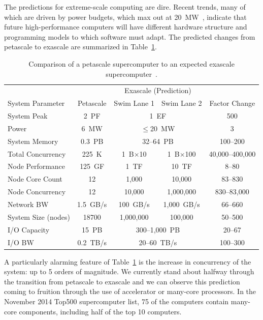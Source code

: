 \documentclass{superfri}
\newcommand*{\lcite}[1]{~\cite{#1}}
\begin{document}
The predictions for extreme-scale computing are dire.  Recent trends, many
of which are driven by power budgets, which max out at
20~MW\lcite{ExascaleArchitecturesReport}, indicate that future
high-performance computers will have different hardware structure and
programming models to which software must adapt. The predicted changes from
petascale to exascale are summarized in
Table~\ref{table:PetascaleVsExascale}.

\begin{table}[htdp]
  \centering
  \caption{Comparison of a petascale supercomputer to an expected exascale
    supercomputer\lcite{ScientificDiscoveryExascale2011}.}
  \label{table:PetascaleVsExascale}
  \begin{tabular}{@{}lcccc@{}}
    \toprule
    & & \multicolumn{2}{c}{Exascale (Prediction)} & \\
    System Parameter & Petascale & Swim Lane 1 & Swim Lane 2 & Factor Change \\
    \midrule
    System Peak & 2~PF & \multicolumn{2}{c}{1~EF} & 500 \\
    Power & 6~MW & \multicolumn{2}{c}{$\le$20~MW} & 3\\
    System Memory & 0.3~PB & \multicolumn{2}{c}{32--64~PB} & 100--200 \\ %
    Total Concurrency & 225~K & 1~B$\times$10 & 1~B$\times$100 & 40,000--400,000 \\
    Node Performance & 125~GF & 1~TF & 10~TF & 8--80\\
    Node Core Count & 12 & 1,000 & 10,000 & 83--830 \\
    Node Concurrency & 12 & 10,000 & 1,000,000 & 830--83,000 \\
    Network BW & 1.5~GB/s & 100~GB/s & 1,000~GB/s & 66--660 \\
    System Size (nodes) & 18700 & 1,000,000 & 100,000 & 50--500 \\
    I/O Capacity & 15~PB & \multicolumn{2}{c}{300--1,000~PB} & 20--67\\
    I/O BW & 0.2~TB/s & \multicolumn{2}{c}{20--60~TB/s} & 100--300 \\
    \bottomrule
  \end{tabular}
\end{table}

A particularly alarming feature of Table~\ref{table:PetascaleVsExascale} is
the increase in concurrency of the system: up to 5 orders of magnitude. We
currently stand about halfway through the transition from petascale to
exascale and we can observe this prediction coming to fruition through the
use of accelerator or many-core processors. In the November 2014 Top500
supercomputer list, 75 of the computers contain many-core components,
including half of the top 10 computers.
\end{document}
